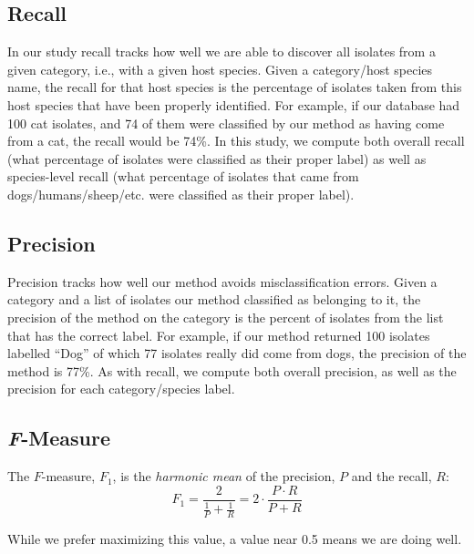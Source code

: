 \subsection{Recall}
In our study recall tracks how well we are able to discover all isolates from a given category, i.e.,
with a given host species. Given a category/host species name, the recall for that host species
is the percentage of isolates taken from this host species that have been properly identified.
For example, if our database had 100 cat isolates, and 74 of them were classified by our
method as having come from a cat, the recall would be 74\%. In this study, we compute both overall
recall (what percentage of isolates were classified as their proper label) as well as 
species-level recall (what percentage of isolates that came from dogs/humans/sheep/etc. were classified
as their proper label).

\subsection{Precision}
Precision tracks how well our method avoids misclassification errors. Given a category and a list
of isolates our method classified as belonging to it, the precision of the method on the
category is the percent of isolates from the list that has the correct label. For example,
if our method returned 100 isolates labelled ``Dog'' of which 77 isolates really did come
from dogs, the precision of the method is 77\%. As with recall, we compute both
overall precision, as well as the precision for each category/species label.

\subsection{\textit{F}-Measure}
The $F$-measure, $F_1$, is the \textit{harmonic mean} of the precision, $P$ and the recall, $R$:
\begin{equation*}
    F_1 
    =
    \frac{2}{\frac{1}{P}
    +
    \frac{1}{R}}
    = 2\cdot
    \frac{P\cdot R}
    {P + R}
\end{equation*}

While we prefer maximizing this value, a value near 0.5 means we are doing well.
